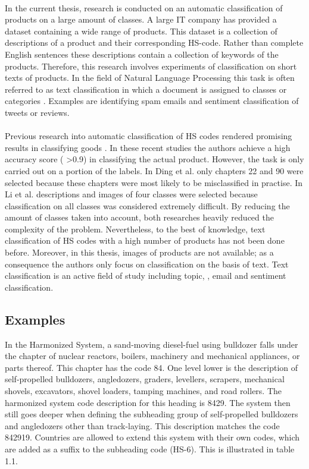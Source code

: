 \\
In the current thesis, research is conducted on an automatic classification of products on a large amount of classes. A large IT company has provided a dataset containing a wide range of products. This dataset is a collection of descriptions of a product and their corresponding HS-code. Rather than complete English sentences these descriptions contain a collection of keywords of the products. Therefore, this research involves experiments of classification on short texts of products. In the field of Natural Language Processing this task is often referred to as text classification in which a document is assigned to classes or categories \cite{Manning2008}. Examples are identifying spam emails and sentiment classification of tweets or reviews.\\
\\
Previous research into automatic classification of HS codes rendered promising results in classifying goods \cite{Ding2015} \cite{Li2019}. In these recent studies the authors achieve a high accuracy score ( \textgreater 0.9) in classifying the actual product. However, the task is only carried out on a portion of the labels. In Ding et al. \cite{Ding2015} only chapters 22 and 90 were selected because these chapters were most likely to be misclassified in practise. In Li et al. \cite{Li2019} descriptions and images of four classes were selected because classification on all classes was considered extremely difficult. By reducing the amount of classes taken into account, both researches heavily reduced the complexity of the problem. Nevertheless, to the best of knowledge, text classification of HS codes with a high number of products has not been done before. Moreover, in this thesis, images of products are not available; as a consequence the authors only focus on classification on the basis of text. Text classification is an active field of study including topic, \cite{Liu2016}, email \cite{7921698} and sentiment \cite{doi:10.1146/annurev-linguistics-011415-040518} classification. 

\subsection{Examples}
In the Harmonized System, a sand-moving diesel-fuel using bulldozer falls under the chapter of nuclear reactors, boilers, machinery and mechanical appliances, or parts thereof. This chapter has the code 84. One level lower is the description of self-propelled bulldozers, angledozers, graders, levellers, scrapers, mechanical shovels, excavators, shovel loaders, tamping machines, and road rollers. The harmonized system code description for this heading is 8429. The system then still goes deeper when defining the subheading group of self-propelled bulldozers and angledozers other than track-laying. This description matches the code 842919. Countries are allowed to extend this system with their own codes, which are added as a suffix to the subheading code (HS-6). This is illustrated in table 1.1.

